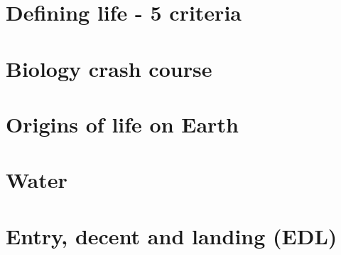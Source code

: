 \documentclass[DIV=calc, paper=a4, fontsize=12pt]{scrartcl}	 %
\begin{document}
\section*{Defining life - 5 criteria}

\begin{multicols}{2}




\end{multicols}

\section*{Biology crash course}

\begin{multicols}{2}



\end{multicols}

\section*{Origins of life on Earth}

\begin{multicols}{2}




\end{multicols}

\section*{Water}

\begin{multicols}{2}







\end{multicols}
\pagebreak
\section*{Entry, decent and landing (EDL)}
\end{document}
